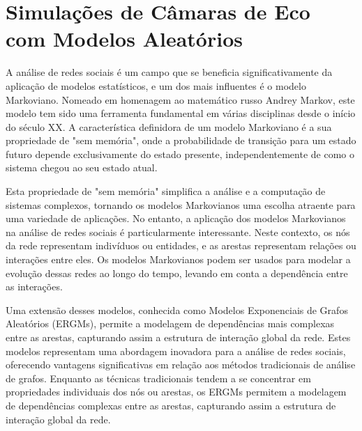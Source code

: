 \section{Simulações de Câmaras de Eco com Modelos Aleatórios}

A análise de redes sociais é um campo que se beneficia significativamente da aplicação de modelos estatísticos, e um dos mais influentes é o modelo Markoviano. Nomeado em homenagem ao matemático russo Andrey Markov, este modelo tem sido uma ferramenta fundamental em várias disciplinas desde o início do século XX. A característica definidora de um modelo Markoviano é a sua propriedade de "sem memória", onde a probabilidade de transição para um estado futuro depende exclusivamente do estado presente, independentemente de como o sistema chegou ao seu estado atual.

Esta propriedade de "sem memória" simplifica a análise e a computação de sistemas complexos, tornando os modelos Markovianos uma escolha atraente para uma variedade de aplicações. No entanto, a aplicação dos modelos Markovianos na análise de redes sociais é particularmente interessante. Neste contexto, os nós da rede representam indivíduos ou entidades, e as arestas representam relações ou interações entre eles. Os modelos Markovianos podem ser usados para modelar a evolução dessas redes ao longo do tempo, levando em conta a dependência entre as interações.

Uma extensão desses modelos, conhecida como Modelos Exponenciais de Grafos Aleatórios (ERGMs), permite a modelagem de dependências mais complexas entre as arestas, capturando assim a estrutura de interação global da rede. Estes modelos representam uma abordagem inovadora para a análise de redes sociais, oferecendo vantagens significativas em relação aos métodos tradicionais de análise de grafos. Enquanto as técnicas tradicionais tendem a se concentrar em propriedades individuais dos nós ou arestas, os ERGMs permitem a modelagem de dependências complexas entre as arestas, capturando assim a estrutura de interação global da rede.


